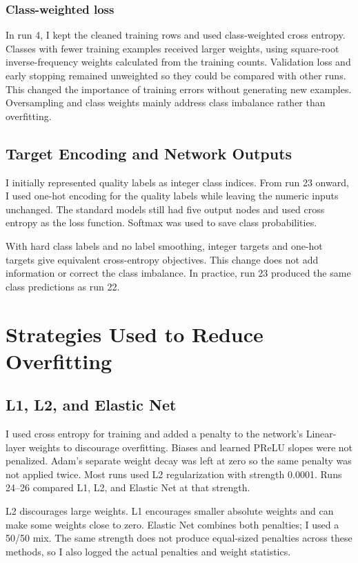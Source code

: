 \documentclass[11pt,letterpaper]{article}
\begin{document}
\subsubsection{Class-weighted loss}
In run 4, I kept the cleaned training rows and used class-weighted cross entropy. Classes with fewer training examples received larger weights, using square-root inverse-frequency weights calculated from the training counts. Validation loss and early stopping remained unweighted so they could be compared with other runs. This changed the importance of training errors without generating new examples. Oversampling and class weights mainly address class imbalance rather than overfitting.

\subsection{Target Encoding and Network Outputs}
I initially represented quality labels as integer class indices. From run 23 onward, I used one-hot encoding for the quality labels while leaving the numeric inputs unchanged. The standard models still had five output nodes and used cross entropy as the loss function. Softmax was used to save class probabilities.

With hard class labels and no label smoothing, integer targets and one-hot targets give equivalent cross-entropy objectives. This change does not add information or correct the class imbalance. In practice, run 23 produced the same class predictions as run 22.


\section{Strategies Used to Reduce Overfitting}
\subsection{L1, L2, and Elastic Net}
I used cross entropy for training and added a penalty to the network's Linear-layer weights to discourage overfitting. Biases and learned PReLU slopes were not penalized. Adam's separate weight decay was left at zero so the same penalty was not applied twice. Most runs used L2 regularization with strength 0.0001. Runs 24--26 compared L1, L2, and Elastic Net at that strength.

L2 discourages large weights. L1 encourages smaller absolute weights and can make some weights close to zero. Elastic Net combines both penalties; I used a 50/50 mix. The same strength does not produce equal-sized penalties across these methods, so I also logged the actual penalties and weight statistics.
\end{document}

